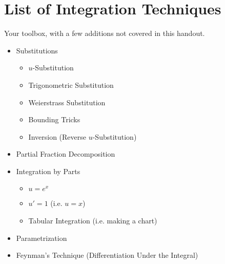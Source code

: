 \documentclass[blue,onecol]{shooting}
\begin{document}
\section{List of Integration Techniques}
Your toolbox, with a few additions not covered in this handout.
\begin{itemize}
    \item Substitutions
    \begin{itemize}
        \item $u$-Substitution
        \item Trigonometric Substitution
        \item Weierstrass Substitution
        \item Bounding Tricks
        \item Inversion (Reverse $u$-Substitution)
    \end{itemize}
    \item Partial Fraction Decomposition
    \item Integration by Parts
    \begin{itemize}
        \item $u=e^x$
        \item $u'=1$ (i.e. $u=x$)
        \item Tabular Integration (i.e. making a chart)
    \end{itemize}
    \item Parametrization
    \item Feynman's Technique (Differentiation Under the Integral)
\end{itemize}

\problems








\end{document}
